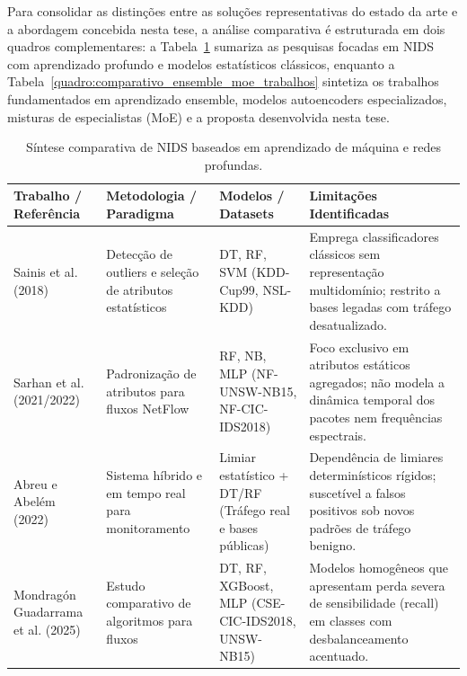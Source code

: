 Para consolidar as distinções entre as soluções representativas do estado da arte e a abordagem concebida nesta tese, a análise comparativa é estruturada em dois quadros complementares: a Tabela~\ref{quadro:comparativo_dl_trabalhos} sumariza as pesquisas focadas em NIDS com aprendizado profundo e modelos estatísticos clássicos, enquanto a Tabela~\ref{quadro:comparativo_ensemble_moe_trabalhos} sintetiza os trabalhos fundamentados em aprendizado ensemble, modelos autoencoders especializados, misturas de especialistas (MoE) e a proposta desenvolvida nesta tese.

\begin{table}[htbp]
\centering
\footnotesize
\caption{Síntese comparativa de NIDS baseados em aprendizado de máquina e redes profundas.}
\label{quadro:comparativo_dl_trabalhos}
\begin{tabularx}{\textwidth}{|>{\raggedright\arraybackslash}p{2.6cm}|>{\raggedright\arraybackslash}p{3.2cm}|>{\raggedright\arraybackslash}p{2.8cm}|>{\raggedright\arraybackslash}X|}
\hline
\textbf{Trabalho / Referência} & \textbf{Metodologia / Paradigma} & \textbf{Modelos / Datasets} & \textbf{Limitações Identificadas} \\
\hline
Sainis et al. (2018) \cite{feature2018} & Detecção de outliers e seleção de atributos estatísticos & DT, RF, SVM \newline (KDD-Cup99, NSL-KDD) & Emprega classificadores clássicos sem representação multidomínio; restrito a bases legadas com tráfego desatualizado. \\
\hline
Sarhan et al. (2021/2022) \cite{netflow2020, standard2021} & Padronização de atributos para fluxos NetFlow & RF, NB, MLP \newline (NF-UNSW-NB15, NF-CIC-IDS2018) & Foco exclusivo em atributos estáticos agregados; não modela a dinâmica temporal dos pacotes nem frequências espectrais. \\
\hline
Abreu e Abelém (2022) \cite{sistema2022} & Sistema híbrido e em tempo real para monitoramento & Limiar estatístico + DT/RF \newline (Tráfego real e bases públicas) & Dependência de limiares determinísticos rígidos; suscetível a falsos positivos sob novos padrões de tráfego benigno. \\
\hline
Mondragón Guadarrama et al. (2025) \cite{advancedids2024} & Estudo comparativo de algoritmos para fluxos & DT, RF, XGBoost, MLP \newline (CSE-CIC-IDS2018, UNSW-NB15) & Modelos homogêneos que apresentam perda severa de sensibilidade (recall) em classes com desbalanceamento acentuado. \\

\end{tabularx}
\end{table}

